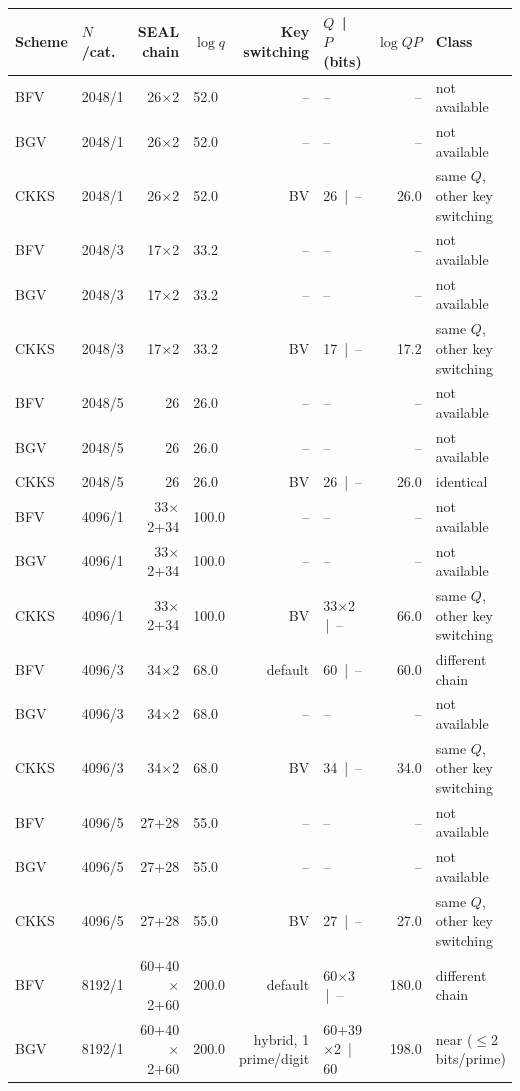 \begin{longtable}{@{}llrlrlrl@{}}
\toprule
Scheme & $N$/cat. & SEAL chain & $\log q$ & Key switching & $Q$ \,|\, $P$ (bits) & $\log QP$ & Class \\
\midrule
\endhead
BFV & 2048/1 & 26$\times$2 & 52.0 & -- & -- & -- & not available \\
BGV & 2048/1 & 26$\times$2 & 52.0 & -- & -- & -- & not available \\
CKKS & 2048/1 & 26$\times$2 & 52.0 & BV & 26 \,|\, -- & 26.0 & same $Q$, other key switching \\
BFV & 2048/3 & 17$\times$2 & 33.2 & -- & -- & -- & not available \\
BGV & 2048/3 & 17$\times$2 & 33.2 & -- & -- & -- & not available \\
CKKS & 2048/3 & 17$\times$2 & 33.2 & BV & 17 \,|\, -- & 17.2 & same $Q$, other key switching \\
BFV & 2048/5 & 26 & 26.0 & -- & -- & -- & not available \\
BGV & 2048/5 & 26 & 26.0 & -- & -- & -- & not available \\
CKKS & 2048/5 & 26 & 26.0 & BV & 26 \,|\, -- & 26.0 & identical \\
BFV & 4096/1 & 33$\times$2+34 & 100.0 & -- & -- & -- & not available \\
BGV & 4096/1 & 33$\times$2+34 & 100.0 & -- & -- & -- & not available \\
CKKS & 4096/1 & 33$\times$2+34 & 100.0 & BV & 33$\times$2 \,|\, -- & 66.0 & same $Q$, other key switching \\
BFV & 4096/3 & 34$\times$2 & 68.0 & default & 60 \,|\, -- & 60.0 & different chain \\
BGV & 4096/3 & 34$\times$2 & 68.0 & -- & -- & -- & not available \\
CKKS & 4096/3 & 34$\times$2 & 68.0 & BV & 34 \,|\, -- & 34.0 & same $Q$, other key switching \\
BFV & 4096/5 & 27+28 & 55.0 & -- & -- & -- & not available \\
BGV & 4096/5 & 27+28 & 55.0 & -- & -- & -- & not available \\
CKKS & 4096/5 & 27+28 & 55.0 & BV & 27 \,|\, -- & 27.0 & same $Q$, other key switching \\
BFV & 8192/1 & 60+40$\times$2+60 & 200.0 & default & 60$\times$3 \,|\, -- & 180.0 & different chain \\
BGV & 8192/1 & 60+40$\times$2+60 & 200.0 & hybrid, 1 prime/digit & 60+39$\times$2 \,|\, 60 & 198.0 & near ($\le$2 bits/prime) \\

\end{longtable}
